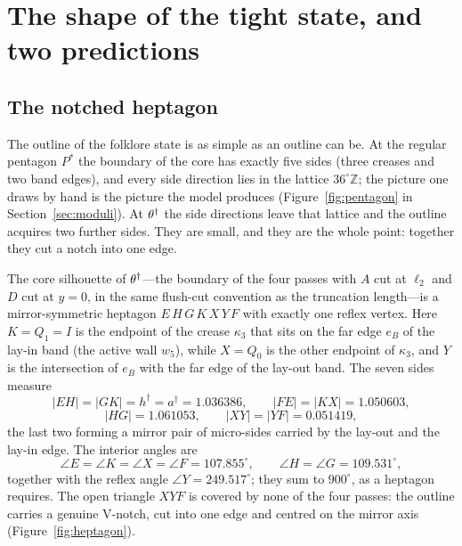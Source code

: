 \section{The shape of the tight state, and two predictions}\label{sec:shape}

\subsection{The notched heptagon}
The outline of the folklore state is as simple as an outline can be. At the regular pentagon $P^*$ the boundary of the core has exactly five sides (three creases and two band edges), and every side direction lies in the lattice $36^\circ\mathbb{Z}$; the picture one draws by hand is the picture the model produces (Figure~\ref{fig:pentagon} in Section~\ref{sec:moduli}). At $\td$ the side directions leave that lattice and the outline acquires two further sides. They are small, and they are the whole point: together they cut a notch into one edge.

\begin{proposition}[Shape of $\td$]\label{prop:heptagon}
The core silhouette of $\td$---the boundary of the four passes with $A$ cut at $\ell_2$ and $D$ cut at $y=0$, in the same flush-cut convention as the truncation length---is a mirror-symmetric heptagon $E\,H\,G\,K\,X\,Y\,F$ with exactly one reflex vertex. Here $K=Q_1=I$ is the endpoint of the crease $\kappa_3$ that sits on the far edge $e_B$ of the lay-in band (the active wall $w_5$), while $X=Q_0$ is the other endpoint of $\kappa_3$, and $Y$ is the intersection of $e_B$ with the far edge of the lay-out band. The seven sides measure
\[
|EH|=|GK|=h^\dagger=a^\dagger=1.036386,\qquad |FE|=|KX|=1.050603,
\]
\[
|HG|=1.061053,\qquad |XY|=|YF|=0.051419,
\]
the last two forming a mirror pair of micro-sides carried by the lay-out and the lay-in edge. The interior angles are
\[
\angle E=\angle K=\angle X=\angle F=107.855^\circ,\qquad \angle H=\angle G=109.531^\circ,
\]
together with the reflex angle $\angle Y=249.517^\circ$; they sum to $900^\circ$, as a heptagon requires. The open triangle $XYF$ is covered by none of the four passes: the outline carries a genuine V-notch, cut into one edge and centred on the mirror axis (Figure~\textup{\ref{fig:heptagon}}).
\end{proposition}


